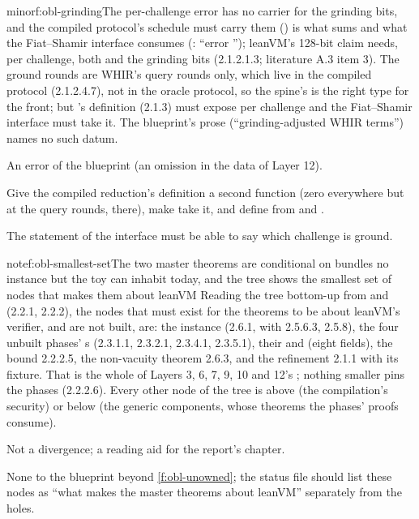 \begin{finding}{minor}{f:obl-grinding}{The per-challenge error has no carrier for the grinding bits, and the compiled protocol's schedule must carry them}
  () is what  sums and what the Fiat–Shamir interface consumes (: ``error ''); leanVM's 128-bit claim needs, per challenge, both  and the grinding bits  (2.1.2.1.3; literature A.3 item 3). The ground rounds are WHIR's query rounds only, which live in the compiled protocol (2.1.2.4.7), not in the oracle protocol, so the spine's  is the right type for the front; but 's definition (2.1.3) must expose  per challenge and the Fiat–Shamir interface must take it. The blueprint's  prose (``grinding-adjusted WHIR terms'') names no such datum.

 An error of the blueprint (an omission in the data of Layer 12).

 Give the compiled reduction's definition a second function  (zero everywhere but at the query rounds,  there), make  take it, and define  from  and .

 The statement of the interface must be able to say which challenge is ground.

\end{finding}

\begin{finding}{note}{f:obl-smallest-set}{The two master theorems are conditional on bundles no instance but the toy can inhabit today, and the tree shows the smallest set of nodes that makes them about leanVM}
 Reading the tree bottom-up from  and  (2.2.1, 2.2.2), the nodes that must exist for the theorems to be about leanVM's verifier, and are not built, are: the instance (2.6.1, with 2.5.6.3, 2.5.8), the four unbuilt phases' s (2.3.1.1, 2.3.2.1, 2.3.4.1, 2.3.5.1), their  and  (eight fields), the bound 2.2.2.5, the non-vacuity theorem 2.6.3, and the refinement 2.1.1 with its fixture. That is the whole of Layers 3, 6, 7, 9, 10 and 12's ; nothing smaller pins the phases (2.2.2.6). Every other node of the tree is above (the compilation's security) or below (the generic components, whose theorems the phases' proofs consume).

 Not a divergence; a reading aid for the report's chapter.

 None to the blueprint beyond \cref{f:obl-unowned}; the status file should list these nodes as ``what makes the master theorems about leanVM'' separately from the holes.

\end{finding}

